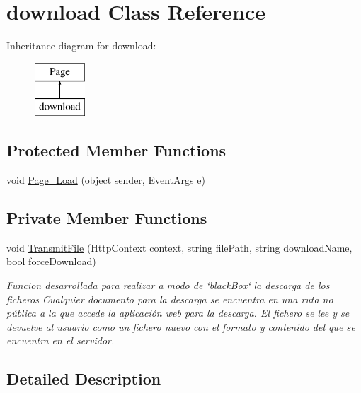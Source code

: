 \hypertarget{classdownload}{}\section{download Class Reference}
\label{classdownload}
Inheritance diagram for download\+:\begin{figure}[H]
\begin{center}
\leavevmode
\includegraphics[height=2.000000cm]{classdownload}
\end{center}
\end{figure}
\subsection*{Protected Member Functions}
\begin{DoxyCompactItemize}
\item 
void \hyperlink{classdownload_a1fd4257623e49112f1d72043b456e11b}{Page\+\_\+\+Load} (object sender, Event\+Args e)
\end{DoxyCompactItemize}
\subsection*{Private Member Functions}
\begin{DoxyCompactItemize}
\item 
void \hyperlink{classdownload_a40d8a7337768a2ab91fcc430f35a6f27}{Transmit\+File} (Http\+Context context, string file\+Path, string download\+Name, bool force\+Download)
\begin{DoxyCompactList}\small\item\em Funcion desarrollada para realizar a modo de \char`\"{}black\+Box\char`\"{} la descarga de los ficheros Cualquier documento para la descarga se encuentra en una ruta no pública a la que accede la aplicación web para la descarga. El fichero se lee y se devuelve al usuario como un fichero nuevo con el formato y contenido del que se encuentra en el servidor. \end{DoxyCompactList}\end{DoxyCompactItemize}


\subsection{Detailed Description}


